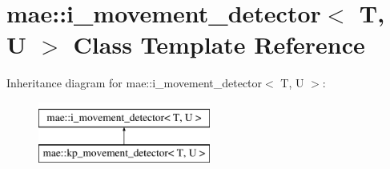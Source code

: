 \hypertarget{classmae_1_1i__movement__detector}{\section{mae\-:\-:i\-\_\-movement\-\_\-detector$<$ T, U $>$ Class Template Reference}
\label{classmae_1_1i__movement__detector}
}
Inheritance diagram for mae\-:\-:i\-\_\-movement\-\_\-detector$<$ T, U $>$\-:\begin{figure}[H]
\begin{center}
\leavevmode
\includegraphics[height=2.000000cm]{classmae_1_1i__movement__detector}
\end{center}
\end{figure}

